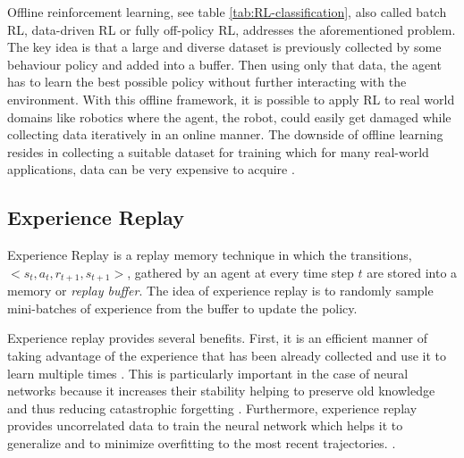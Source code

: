 Offline reinforcement learning, see table \ref{tab:RL-classification}, also called batch RL, data-driven RL or fully off-policy RL,  addresses the aforementioned problem. The key idea is that a large and diverse dataset is previously collected by some behaviour policy and added into a buffer. Then using only that data, the agent has to learn the best possible policy without further interacting with the environment. With this offline framework, it is possible to apply RL to real world domains like robotics where the agent, the robot, could easily get damaged while collecting data iteratively in an online manner. The downside of offline learning resides in collecting a suitable dataset for training which for many real-world applications, data can be very expensive to acquire \cite{collecting_data_for_offline_learning}.







\subsection{Experience Replay}
\label{subsection:Experience Replay}

Experience Replay is a replay memory technique in which the transitions, $<s_t, a_t, r_{t+1}, s_{t+1}>$, gathered by an agent at every time step $t$ are stored into a memory or \textit{replay buffer}. The idea of experience replay is to randomly sample mini-batches of experience from the buffer to update the policy. 




Experience replay provides several benefits. First, it is an efficient manner of taking advantage of the experience that has been already collected and use it to learn multiple times \cite{Experience-Replay-zhang:2018}. This is particularly important in the case of neural networks because it increases their stability helping to preserve old knowledge and thus reducing catastrophic forgetting \cite{Experience_replay_stability:2019}.
Furthermore, experience replay provides uncorrelated data to train the neural network which helps it to generalize and to minimize overfitting to the most recent trajectories. \cite{Machine_learning_finance:2019}.

